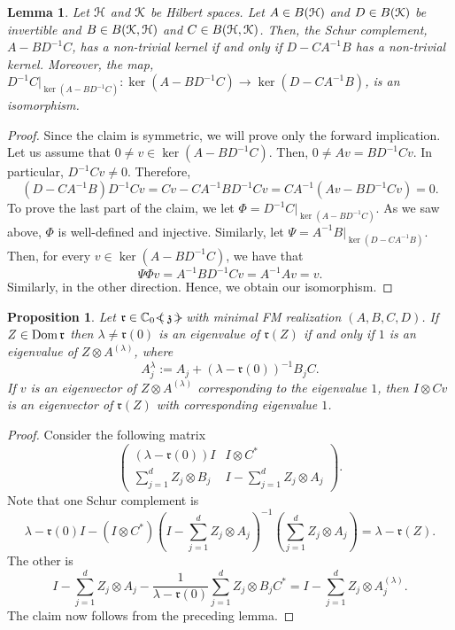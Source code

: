\documentclass{article}
\newtheorem{prop}[thm]{Proposition}
\newtheorem{lem}[thm]{Lemma}
\theoremstyle{definition}
\theoremstyle{remark}
\numberwithin{equation}{section}
\newcommand{\mr}{\ensuremath{\mathrm}}
\newcommand{\mf}{\ensuremath{\mathfrak}}
\newcommand{\la}{\ensuremath{\lambda }}
\def\C{\mathbb{C}}
\def\fr{\mathfrak{r}}
\def\nbdom{\mr{Dom} \, }
\def\ratfps{\C _0 \ \mathclap{\, <}{\left( \right.} \,  \mf{z} \, \mathclap{ \, \, \, \, >}{\left. \right)} }
\begin{document}
\begin{lem}
Let ${\mathcal H}$ and ${\mathcal K}$ be Hilbert spaces. Let $A \in B({\mathcal H})$ and $D \in B({\mathcal K})$ be invertible and $B \in B({\mathcal K},{\mathcal H})$ and $C \in B({\mathcal H}, {\mathcal K})$. Then, the Schur complement, $A - B D^{-1} C$, has a non-trivial kernel if and only if $D - C A^{-1} B$ has a non-trivial kernel. Moreover, the map, $D^{-1} C|_{\ker (A - B D^{-1} C)} \colon \ker (A - B D^{-1} C) \to \ker (D - C A^{-1} B)$, is an isomorphism.
\end{lem}
\begin{proof}
Since the claim is symmetric, we will prove only the forward implication. Let us assume that $0 \neq v \in \ker(A - B D^{-1} C)$. Then, $0 
\neq A v = B D^{-1} C v$. In particular, $D^{-1} C v \neq 0$. Therefore,
\[
(D - C A^{-1} B) D^{-1} C v = C v - C A^{-1} B D^{-1} C v = C A^{-1}(A v- B D^{-1} C v) = 0. 
\]
To prove the last part of the claim, we let $\Phi = D^{-1} C|_{\ker (A - B D^{-1} C)}$. As we saw above, $\Phi$ is well-defined and injective. Similarly, let $\Psi = A^{-1} B|_{\ker (D - C A^{-1} B)}$. Then, for every $v \in \ker (A - B D^{-1} C)$, we have that
\[
\Psi \Phi v = A^{-1} B D^{-1} C v = A^{-1} A v = v.
\]
Similarly, in the other direction. Hence, we obtain our isomorphism.
\end{proof}


\begin{prop} \label{lem:spectrum_of_schur_complement}
Let $\fr \in \ratfps$ with minimal FM realization $(A,B,C,D)$. If $Z \in \nbdom \fr$ then $\la \neq \fr (0)$ is an eigenvalue of $\fr (Z)$ if and only if $1$ is an eigenvalue of $Z \otimes A ^{(\la)}$, where 
$$ A^{\la } _j :=   A_j  + (\la - \fr (0) ) ^{-1} B_j C.$$  If $v$ is an eigenvector of $Z \otimes A^{(\la)}$ corresponding to the eigenvalue $1$, then $I \otimes C v$ is an eigenvector of $\fr (Z)$ with corresponding eigenvalue $1$. 
\end{prop}
\begin{proof}
Consider the following matrix
\[
\begin{pmatrix} (\lambda - \fr(0)) I & I \otimes C^* \\ \sum_{j=1}^d Z_j \otimes B_j & I - \sum_{j=1}^d Z_j \otimes A_j \end{pmatrix}.
\]
Note that one Schur complement is $$\lambda - \fr(0) I - (I \otimes C^*) \left(I - \sum_{j=1}^d Z_j \otimes A_j \right)^{-1} \left(\sum_{j=1}^d Z_j \otimes A_j\right) = \lambda - \fr(Z). $$ The other is $$I - \sum_{j=1}^d Z_j \otimes A_j - \frac{1}{\lambda - \fr(0)} \sum_{j=1}^d Z_j \otimes B_j C^* = I - \sum_{j=1}^d Z_j \otimes A^{(\lambda)}_j.$$ The claim now follows from the preceding lemma.
\end{proof}
\end{document}
